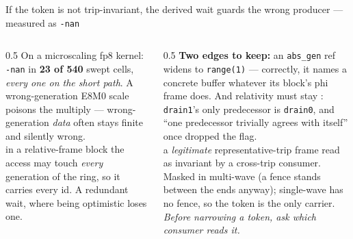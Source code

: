 \begin{frame}{If the token is not trip-invariant, the derived wait guards the wrong producer --- measured as \texttt{-nan}}
\footnotesize
\begin{center}
\end{center}

\begin{columns}[T]
\begin{column}{0.5\textwidth}
 On a microscaling fp8 kernel: \texttt{-nan} in \textbf{23 of 540} swept cells,
\emph{every one on the short path}. A wrong-generation E8M0 scale poisons the multiply --- wrong-generation
\emph{data} often stays finite and silently wrong.\\[3pt]
 in a relative-frame block the access may touch \emph{every}
generation of the ring, so it carries every id. A redundant wait, where being optimistic loses one.
\end{column}
\begin{column}{0.5\textwidth}
\textbf{Two edges to keep:} an \texttt{abs\_gen} ref widens to \texttt{range(1)} --- correctly, it names a
concrete buffer whatever its block's phi frame does. And relativity must stay : \texttt{drain1}'s
only predecessor is \texttt{drain0}, and ``one predecessor trivially agrees with itself'' once dropped the flag.\\[3pt]
 a \emph{legitimate} representative-trip frame read as invariant by a cross-trip consumer. Masked
in multi-wave (a fence stands between the ends anyway); single-wave has no fence, so the token is the only carrier.
\emph{Before narrowing a token, ask which consumer reads it.}
\end{column}
\end{columns}
\end{frame}

